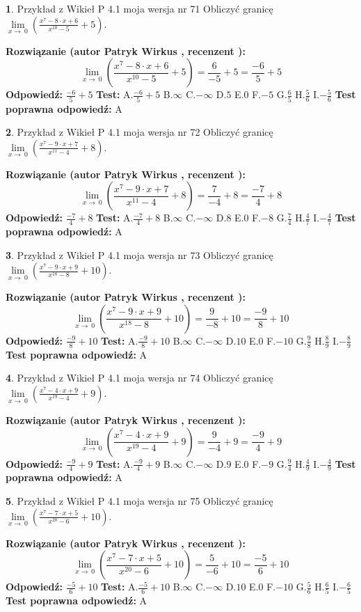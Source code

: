\documentclass[12pt, a4paper]{article}
\theoremstyle{definition} %
\newtheorem{zad}{}
\newcommand{\zadStart}[1]{\begin{zad}#1\newline}
\newcommand{\zadStop}{\end{zad}}
\newcommand{\rozwStart}[2]{\noindent \textbf{Rozwiązanie (autor #1 , recenzent #2): }\newline}
\newcommand{\rozwStop}{\newline}
\newcommand{\odpStart}{\noindent \textbf{Odpowiedź:}\newline}
\newcommand{\odpStop}{\newline}
\newcommand{\testStart}{\noindent \textbf{Test:}\newline}
\newcommand{\testStop}{\newline}
\newcommand{\kluczStart}{\noindent \textbf{Test poprawna odpowiedź:}\newline}
\newcommand{\kluczStop}{\newline}
\begin{document}
\zadStart{Przykład z Wikieł P 4.1 moja wersja nr 71}
Obliczyć granicę $\lim\limits_{x\to\ 0}(\frac{x^{7}-8 \cdot x +6}{x^{10}-5}+5)$.
\zadStop
\rozwStart{Patryk Wirkus}{}
$$\lim\limits_{x\to\ 0}(\frac{x^{7}-8 \cdot x +6}{x^{10}-5}+5)=\frac{6}{-5}+5=\frac{-6}{5}+5$$
\rozwStop
\odpStart
$\frac{-6}{5}+5$
\odpStop
\testStart
A.$\frac{-6}{5}+5$
B.$\infty$
C.$-\infty$
D.$5$
E.$0$
F.$-5$
G.$\frac{6}{5}$
H.$\frac{5}{6}$
I.$-\frac{5}{6}$
\testStop
\kluczStart
A
\kluczStop



\zadStart{Przykład z Wikieł P 4.1 moja wersja nr 72}
Obliczyć granicę $\lim\limits_{x\to\ 0}(\frac{x^{7}-9 \cdot x +7}{x^{11}-4}+8)$.
\zadStop
\rozwStart{Patryk Wirkus}{}
$$\lim\limits_{x\to\ 0}(\frac{x^{7}-9 \cdot x +7}{x^{11}-4}+8)=\frac{7}{-4}+8=\frac{-7}{4}+8$$
\rozwStop
\odpStart
$\frac{-7}{4}+8$
\odpStop
\testStart
A.$\frac{-7}{4}+8$
B.$\infty$
C.$-\infty$
D.$8$
E.$0$
F.$-8$
G.$\frac{7}{4}$
H.$\frac{4}{7}$
I.$-\frac{4}{7}$
\testStop
\kluczStart
A
\kluczStop



\zadStart{Przykład z Wikieł P 4.1 moja wersja nr 73}
Obliczyć granicę $\lim\limits_{x\to\ 0}(\frac{x^{7}-9 \cdot x +9}{x^{18}-8}+10)$.
\zadStop
\rozwStart{Patryk Wirkus}{}
$$\lim\limits_{x\to\ 0}(\frac{x^{7}-9 \cdot x +9}{x^{18}-8}+10)=\frac{9}{-8}+10=\frac{-9}{8}+10$$
\rozwStop
\odpStart
$\frac{-9}{8}+10$
\odpStop
\testStart
A.$\frac{-9}{8}+10$
B.$\infty$
C.$-\infty$
D.$10$
E.$0$
F.$-10$
G.$\frac{9}{8}$
H.$\frac{8}{9}$
I.$-\frac{8}{9}$
\testStop
\kluczStart
A
\kluczStop



\zadStart{Przykład z Wikieł P 4.1 moja wersja nr 74}
Obliczyć granicę $\lim\limits_{x\to\ 0}(\frac{x^{7}-4 \cdot x +9}{x^{19}-4}+9)$.
\zadStop
\rozwStart{Patryk Wirkus}{}
$$\lim\limits_{x\to\ 0}(\frac{x^{7}-4 \cdot x +9}{x^{19}-4}+9)=\frac{9}{-4}+9=\frac{-9}{4}+9$$
\rozwStop
\odpStart
$\frac{-9}{4}+9$
\odpStop
\testStart
A.$\frac{-9}{4}+9$
B.$\infty$
C.$-\infty$
D.$9$
E.$0$
F.$-9$
G.$\frac{9}{4}$
H.$\frac{4}{9}$
I.$-\frac{4}{9}$
\testStop
\kluczStart
A
\kluczStop



\zadStart{Przykład z Wikieł P 4.1 moja wersja nr 75}
Obliczyć granicę $\lim\limits_{x\to\ 0}(\frac{x^{7}-7 \cdot x +5}{x^{20}-6}+10)$.
\zadStop
\rozwStart{Patryk Wirkus}{}
$$\lim\limits_{x\to\ 0}(\frac{x^{7}-7 \cdot x +5}{x^{20}-6}+10)=\frac{5}{-6}+10=\frac{-5}{6}+10$$
\rozwStop
\odpStart
$\frac{-5}{6}+10$
\odpStop
\testStart
A.$\frac{-5}{6}+10$
B.$\infty$
C.$-\infty$
D.$10$
E.$0$
F.$-10$
G.$\frac{5}{6}$
H.$\frac{6}{5}$
I.$-\frac{6}{5}$
\testStop
\kluczStart
A
\kluczStop
\end{document}
